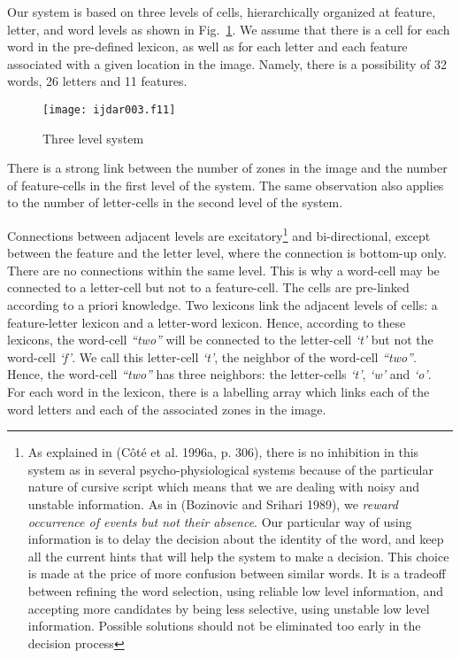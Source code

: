 \documentclass[ijdar]{svjour}
\begin{document}
Our system is based on three levels of cells, hierarchically organized at feature, letter, and word levels as shown in Fig.~\ref{FIGPROCESS}.
We assume that there is a cell for each word in the pre-defined lexicon, as well as for each letter and each feature associated with a given location in the image.
Namely, there is a possibility of 32 words, 26 letters and 11 features.

\begin{figure}%
\texttt{[image: ijdar003.f11]}%
\caption{Three level system}
\label{FIGPROCESS}
\end{figure}


There is a strong link between the number of zones in the image and the number of feature-cells in the first level of the system.
The same observation also applies to the number of letter-cells in the second level of the system.


Connections between adjacent levels are excitatory\footnote{As explained in (C\^ot\'e et al. 1996a, p. 306), there is no inhibition in this system as in several psycho-physiological systems because of the particular nature of cursive script which means that we are dealing with noisy and unstable information.  As in (Bozinovic and Srihari 1989), we {\it reward occurrence of events but not their absence}. Our particular way of using information is to delay the decision about the identity of the word,
and keep all the
current hints that will help the system to make a decision.  This choice is made at the price of more confusion between similar words. It is a tradeoff between refining the word selection, using reliable low level information, and accepting more candidates by being less selective, using unstable low level information. Possible solutions should not be eliminated too early in the decision process} and bi-directional, except between the feature and the letter level, where the connection is bottom-up
 only.\break
There are no connections within the same level.
This is why a word-cell may be connected to a letter-cell but not to a feature-cell.
The cells are pre-linked according to a priori knowledge.
Two lexicons link the adjacent levels of cells: a feature-letter lexicon and a letter-word lexicon.
Hence, according to these lexicons, the word-cell {\it ``two''} will be connected to the letter-cell {\it `t'} but not the word-cell {\it `f'}.
We call this letter-cell  {\it `t'}, the neighbor of the word-cell  {\it ``two''}.
Hence, the word-cell  {\it ``two''} has three neighbors: the letter-cells  {\it `t'},  {\it `w'} and  {\it `o'}.
For each word in the lexicon, there is a labelling array which links each of the word letters and each of the associated zones in the image.
\end{document}
